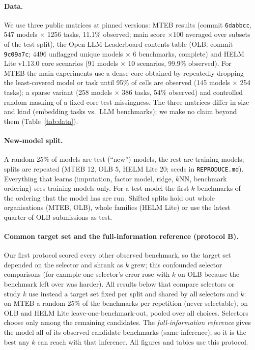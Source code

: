 \documentclass{article}
\begin{document}
\paragraph{Data.} We use three public matrices at pinned versions: MTEB results (commit \texttt{6dabbcc}, 547 models $\times$ 1256 tasks, 11.1\% observed; main score $\times100$ averaged over subsets of the test split), the Open LLM Leaderboard contents table (OLB; commit \texttt{9c09a7c}; 4496 unflagged unique models $\times$ 6 benchmarks, complete) and HELM Lite v1.13.0 core scenarios (91 models $\times$ 10 scenarios, 99.9\% observed). For MTEB the main experiments use a dense core obtained by repeatedly dropping the least-covered model or task until 95\% of cells are observed (145 models $\times$ 254 tasks); a sparse variant (258 models $\times$ 386 tasks, 54\% observed) and controlled random masking of a fixed core test missingness. The three matrices differ in size and kind (embedding tasks vs.\ LLM benchmarks); we make no claim beyond them (Table~\ref{tab:data}).

\paragraph{New-model split.} A random 25\% of models are test (``new'') models, the rest are training models; splits are repeated (MTEB 12, OLB 5, HELM Lite 20; seeds in \texttt{REPRODUCE.md}). Everything that learns (imputation, factor model, ridge, $k$NN, benchmark ordering) sees training models only. For a test model the first $k$ benchmarks of the ordering that the model has are run. Shifted splits hold out whole organisations (MTEB, OLB), whole families (HELM Lite) or use the latest quarter of OLB submissions as test.

\paragraph{Common target set and the full-information reference (protocol B).} Our first protocol scored every other observed benchmark, so the target set depended on the selector and shrank as $k$ grew; this confounded selector comparisons (for example one selector's error rose with $k$ on OLB because the benchmark left over was harder). All results below that compare selectors or study $k$ use instead a target set fixed per split and shared by all selectors and $k$: on MTEB a random 25\% of the benchmarks per repetition (never selectable), on OLB and HELM Lite leave-one-benchmark-out, pooled over all choices. Selectors choose only among the remaining candidates. The \emph{full-information reference} gives the model all of its observed candidate benchmarks (same inference), so it is the best any $k$ can reach with that inference. All figures and tables use this protocol.
\end{document}
